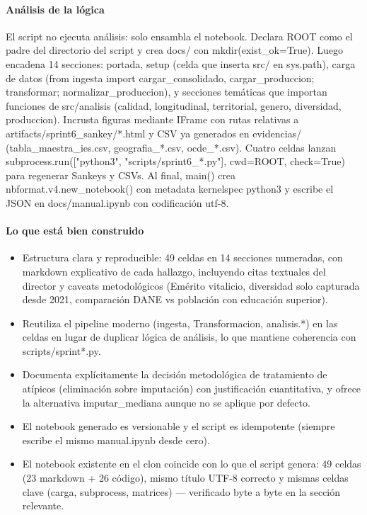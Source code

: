 \paragraph{Análisis de la lógica}
El script no ejecuta análisis: solo ensambla el notebook. Declara ROOT como el padre del directorio del script y crea docs/ con mkdir(exist\_ok=True). Luego encadena 14 secciones: portada, setup (celda que inserta src/ en sys.path), carga de datos (from ingesta import cargar\_consolidado, cargar\_produccion; transformar; normalizar\_produccion), y secciones temáticas que importan funciones de src/analisis (calidad, longitudinal, territorial, genero, diversidad, produccion). Incrusta figuras mediante IFrame con rutas relativas a artifacts/sprint6\_sankey/*.html y CSV ya generados en evidencias/ (tabla\_maestra\_ies.csv, geografia\_*.csv, ocde\_*.csv). Cuatro celdas lanzan subprocess.run(["python3", "scripts/sprint6\_*.py"], cwd=ROOT, check=True) para regenerar Sankeys y CSVs. Al final, main() crea nbformat.v4.new\_notebook() con metadata kernelspec python3 y escribe el JSON en docs/manual.ipynb con codificación utf-8.

\paragraph{Lo que está bien construido}
\begin{itemize}
  \item Estructura clara y reproducible: 49 celdas en 14 secciones numeradas, con markdown explicativo de cada hallazgo, incluyendo citas textuales del director y caveats metodológicos (Emérito vitalicio, diversidad solo capturada desde 2021, comparación DANE vs población con educación superior).
  \item Reutiliza el pipeline moderno (ingesta, Transformacion, analisis.*) en las celdas en lugar de duplicar lógica de análisis, lo que mantiene coherencia con scripts/sprint*.py.
  \item Documenta explícitamente la decisión metodológica de tratamiento de atípicos (eliminación sobre imputación) con justificación cuantitativa, y ofrece la alternativa imputar\_mediana aunque no se aplique por defecto.
  \item El notebook generado es versionable y el script es idempotente (siempre escribe el mismo manual.ipynb desde cero).
  \item El notebook existente en el clon coincide con lo que el script genera: 49 celdas (23 markdown + 26 código), mismo título UTF-8 correcto y mismas celdas clave (carga, subprocess, matrices) --- verificado byte a byte en la sección relevante.
\end{itemize}

